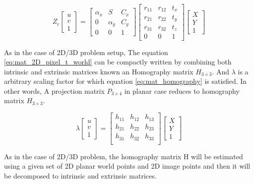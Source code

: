 \begin{equation}
Z_c \left[ 
\begin{array}{c} u\\ v\\ 1 \end{array} 
\right] = 
\begin{bmatrix}
\alpha_x & S & C_x \\
0 & \alpha_y & C_y \\
0 & 0 & 1
\end{bmatrix} 
\begin{bmatrix}
r_{11} &r_{12}  &t_x\\
r_{21} &r_{22}  &t_y\\
r_{31} &r_{32}  &t_z \\
0 &0 &1
\end{bmatrix}
\left[ 
\begin{array}{c} X\\ Y\\ 1 \end{array} 
\right]
\label{eq:mat_2D_pixel_t_world}
\end{equation}

As in the case of 2D/3D problem setup, The equation \ref{eq:mat_2D_pixel_t_world} can be compactly written by combining both intrinsic and extrinsic matrices known an Homography matrix \textbf{$H_{3\times3}$}. And $\lambda$ is a arbitrary scaling factor for which equation \ref{eq:mat_homography} is satisfied. In other words, A projection matrix \textbf{$P_{3\times4}$} in planar case reduces to homography matrix \textbf{$H_{3\times3}$}.

\begin{equation}
\lambda \left[ 
\begin{array}{c} u\\ v\\ 1 \end{array} 
\right] = 
\begin{bmatrix}
h_{11} &h_{12}  &h_{13} \\
h_{21} &h_{22}  &h_{23} \\
h_{31} &h_{32}  &h_{33} \\
\end{bmatrix}
\left[ 
\begin{array}{c} X\\ Y\\ 1 \end{array} 
\right]
\label{eq:mat_homography}
\end{equation} 

As in the case of 2D/3D problem, the homography matrix H will be estimated using a given set of 2D planar world points and 2D image points and then it will be decomposed to intrinsic and extrinsic matrices.\\

